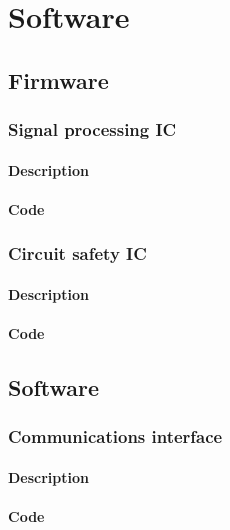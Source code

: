 \chapter{Software}

\section{Firmware}

\subsection{Signal processing IC}

\subsubsection{Description}

\subsubsection{Code}

\subsection{Circuit safety IC}

\subsubsection{Description}

\subsubsection{Code}

\section{Software}

\subsection{Communications interface}

\subsubsection{Description}

\subsubsection{Code}

